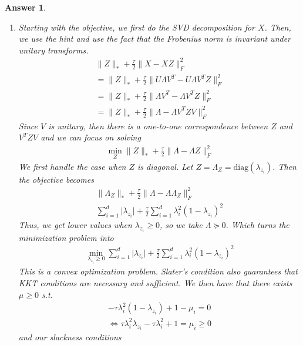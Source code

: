 \documentclass[12pt]{article}
\theoremstyle{colon}
\newtheorem*{answer}{Answer}
\begin{document}
\begin{answer}
\begin{enumerate}[label=\arabic*)]
    \item Starting with the objective, we first do the SVD decomposition for $X$. Then, we use the hint and use the fact that the Frobenius norm is invariant under unitary transforms.
      \begin{gather*}
        \lVert Z \rVert_* + \frac{\tau}{2} \lVert X - X Z \rVert_F^2 \\
        = \lVert Z \rVert_* + \frac{\tau}{2} \lVert U \Lambda V^T - U \Lambda V^T Z \rVert_F^2 \\
        = \lVert Z \rVert_* + \frac{\tau}{2} \lVert \Lambda V^T - \Lambda V^T Z \rVert_F^2 \\
        = \lVert Z \rVert_* + \frac{\tau}{2} \lVert \Lambda - \Lambda V^T Z V \rVert_F^2
      \end{gather*}
      Since $V$ is unitary, then there is a one-to-one correspondence between $Z$ and $V^T Z V$ and we can focus on solving
      \begin{gather*}
        \min_Z \lVert Z \rVert_* + \frac{\tau}{2} \lVert \Lambda - \Lambda Z \rVert_F^2
      \end{gather*}
      We first handle the case when $Z$ is diagonal. Let $Z = \Lambda_Z = \text{diag}(\lambda_{z_i})$. Then the objective becomes
      \begin{gather*}
        \lVert \Lambda_Z \rVert_* + \frac{\tau}{2} \lVert \Lambda - \Lambda \Lambda_Z \rVert_F^2 \\
        \sum_{i=1}^d \lvert \lambda_{z_i} \rvert + \frac{\tau}{2} \sum_{i=1}^d \lambda_i^2 (1-\lambda_{z_i})^2
      \end{gather*}
      Thus, we get lower values when $\lambda_{z_i} \geq 0$, so we take $\Lambda \succeq 0$. Which turns the minimization problem into
      \begin{gather*}
        \min_{\lambda_{z_i} \geq 0} \sum_{i=1}^d \lvert \lambda_{z_i} \rvert + \frac{\tau}{2} \sum_{i=1}^d \lambda_i^2 (1-\lambda_{z_i})^2
      \end{gather*}
      This is a convex optimization problem. Slater's condition also guarantees that KKT conditions are necessary and sufficient. We then have that there exists $\mu \geq 0$ s.t.
      \begin{gather*}
        - \tau \lambda_i^2 (1-\lambda_{z_i}) + 1 - \mu_i = 0 \\
        \Longleftrightarrow \tau \lambda_i^2 \lambda_{z_i} - \tau \lambda_i^2 + 1 = \mu_i \geq 0
      \end{gather*}
      and our slackness conditions
      \begin{gather*}

\end{gather*}
\end{enumerate}
\end{answer}
\end{document}
